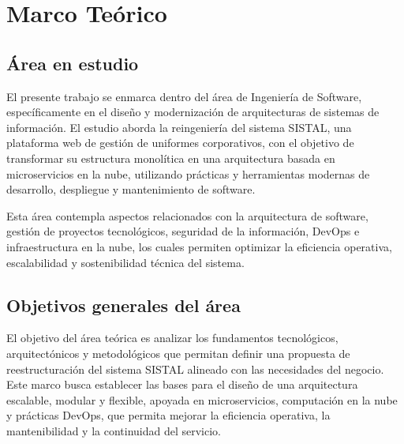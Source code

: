 \chapter{Marco Teórico}

\section{Área en estudio}

% 
% 
% 

El presente trabajo se enmarca dentro del área de Ingeniería de Software, específicamente en el diseño y modernización de arquitecturas de sistemas de información.
El estudio aborda la reingeniería del sistema SISTAL, una plataforma web de gestión de uniformes corporativos, con el objetivo de transformar su estructura monolítica en una arquitectura basada en microservicios en la nube, utilizando prácticas y herramientas modernas de desarrollo, despliegue y mantenimiento de software.

Esta área contempla aspectos relacionados con la arquitectura de software, gestión de proyectos tecnológicos, seguridad de la información, DevOps e infraestructura en la nube, los cuales permiten optimizar la eficiencia operativa, escalabilidad y sostenibilidad técnica del sistema.

\section{Objetivos generales del área}


El objetivo del área teórica es analizar los fundamentos tecnológicos, arquitectónicos y metodológicos que permitan definir una propuesta de reestructuración del sistema SISTAL alineado con las necesidades del negocio.
Este marco busca establecer las bases para el diseño de una arquitectura escalable, modular y flexible, apoyada en microservicios, computación en la nube y prácticas DevOps, que permita mejorar la eficiencia operativa, la mantenibilidad y la continuidad del servicio.

